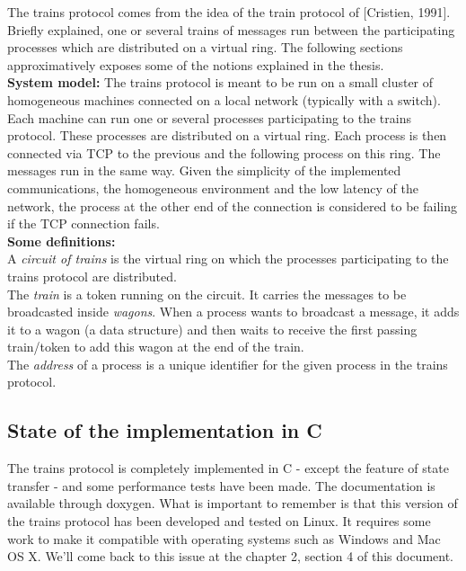 \documentclass[a4paper,10pt]{report}
\begin{document}
The trains protocol comes from the idea of the train protocol of [Cristien, 1991]. Briefly explained, one or several trains of messages
run between the participating processes which are distributed on a virtual ring. The following sections approximatively exposes some of the
notions explained in the thesis.\\


\textbf{System model:} The trains protocol is meant to be run on a small cluster of homogeneous machines connected on a local network (typically with a switch). Each machine
can run one or several processes participating to the trains protocol. These processes are distributed on a virtual ring. Each process is then
connected via TCP to the previous and the following process on this ring. The messages run in the same way.
Given the simplicity of the implemented communications, the homogeneous environment and the low latency of the network, the process at the other end of the connection is considered to be failing if the TCP connection fails.\\


\textbf{Some definitions:}\\ 
A \textit{circuit of trains} is the virtual ring on which the processes participating to the 
trains protocol are distributed.\\
The \textit{train} is a token running on the circuit. It carries the messages to be broadcasted inside \textit{wagons}.
When a process wants to broadcast a message, it adds it to a wagon (a data structure) and then waits to receive the first passing train/token to add
this wagon at the end of the train.\\
The \textit{address} of a process is a unique identifier for the given process in the trains protocol.

\subsection{State of the implementation in C}

The trains protocol is completely implemented in C - except the feature of state transfer - and some performance tests have been made.
The documentation is available through doxygen.
What is important to remember is that this version of the trains protocol has been developed and tested on Linux. It requires 
some work to make it compatible with operating systems such as Windows and Mac OS X. We'll come back to this issue at the chapter 2, 
section 4 of this document.\\
\end{document}
